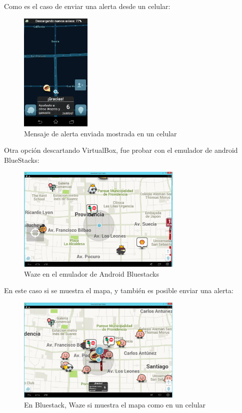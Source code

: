 Como es el caso de enviar una alerta desde un celular:

        \begin{figure}[H]
  \begin{center}
    \includegraphics[width=0.3\textwidth]{imagenes/fig34.png}
    \caption{Mensaje de alerta enviada mostrada en un celular}
  \end{center}
\end{figure}

Otra opción descartando VirtualBox, fue probar con el emulador de android BlueStacks:

        \begin{figure}[H]
  \begin{center}
    \includegraphics[width=0.7\textwidth]{imagenes/fig35.png}
    \caption{Waze en el emulador de Android Bluestacks}
  \end{center}
\end{figure}

En este caso si se muestra el mapa, y también es posible enviar una alerta:

        \begin{figure}[H]
  \begin{center}
    \includegraphics[width=0.7\textwidth]{imagenes/fig36.png}
    \caption{En Bluestack, Waze si muestra el mapa como en un celular}
  \end{center}
\end{figure}


